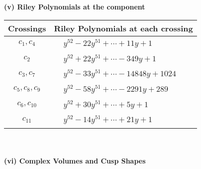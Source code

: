 \documentclass[1p]{elsarticle_modified}
\theoremstyle{definition}
\begin{document}
\newpage\renewcommand{\arraystretch}{1}
\flushleft \textbf{(v) Riley Polynomials at the component}\newline \\
\begin{tabular}{m{50pt}|m{274pt}}
Crossings & \hspace{64pt}Riley Polynomials at each crossing \\
\hline $$\begin{aligned}c_{1},c_{4}\end{aligned}$$&$\begin{aligned}
&y^{52}-22 y^{51}+\cdots+11 y+1
\end{aligned}$\\
\hline $$\begin{aligned}c_{2}\end{aligned}$$&$\begin{aligned}
&y^{52}+22 y^{51}+\cdots-349 y+1
\end{aligned}$\\
\hline $$\begin{aligned}c_{3},c_{7}\end{aligned}$$&$\begin{aligned}
&y^{52}-33 y^{51}+\cdots-14848 y+1024
\end{aligned}$\\
\hline $$\begin{aligned}c_{5},c_{8},c_{9}\end{aligned}$$&$\begin{aligned}
&y^{52}-58 y^{51}+\cdots-2291 y+289
\end{aligned}$\\
\hline $$\begin{aligned}c_{6},c_{10}\end{aligned}$$&$\begin{aligned}
&y^{52}+30 y^{51}+\cdots+5 y+1
\end{aligned}$\\
\hline $$\begin{aligned}c_{11}\end{aligned}$$&$\begin{aligned}
&y^{52}-14 y^{51}+\cdots+21 y+1
\end{aligned}$\\
\hline
\end{tabular}\\~\\
\newpage\flushleft \textbf{(vi) Complex Volumes and Cusp Shapes}
\end{document}

